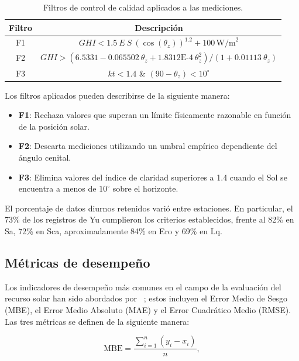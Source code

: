 \begin{table}[h!]
\caption{Filtros de control de calidad aplicados a las mediciones.}
\label{tab:qc}
\centering
\resizebox{\linewidth}{!} {
\def\arraystretch{1.5}
\begin{tabular}{cc}
\hline
\textbf{Filtro} & \textbf{Descripción}\\ 
\hline
F1 & $GHI < 1.5~E~S~(\cos(\theta_z))^{1.2} + 100 \, \text{W/m}^2$  \\
F2 & $GHI > (6.5331 - 0.065502~\theta_z + 1.8312\text{E-4}~\theta_z^2)/(1 + 0.01113~\theta_z)$ \\
F3 & $kt < 1.4$ \& $ (90-\theta_z) < 10^\circ$  \\
\hline
\end{tabular}}
\end{table}

Los filtros aplicados pueden describirse de la siguiente manera:

\begin{itemize}
    \item \textbf{F1}: Rechaza valores que superan un límite físicamente razonable en función de la posición solar.
    \item \textbf{F2}: Descarta mediciones utilizando un umbral empírico dependiente del ángulo cenital.
    \item \textbf{F3}: Elimina valores del índice de claridad superiores a 1.4 cuando el Sol se encuentra a menos de $10^\circ$ sobre el horizonte.
\end{itemize}

El porcentaje de datos diurnos retenidos varió entre estaciones. En particular, el 73\% de los registros de Yu cumplieron los criterios establecidos, frente al 82\% en Sa, 72\% en Sca, aproximadamente 84\% en Ero y 69\% en Lq.





\subsection{Métricas de desempeño}

Los indicadores de desempeño más comunes en el campo de la evaluación del recurso solar han sido abordados por ~\cite{ZHANG}; estos incluyen el Error Medio de Sesgo (MBE), el Error Medio Absoluto (MAE) y el Error Cuadrático Medio (RMSE). Las tres métricas se definen de la siguiente manera:

\begin{equation}
\text{MBE} = \frac{\sum_{i=1}^{n} ( {y_i} - {x_i} ) }{n},
\end{equation}


